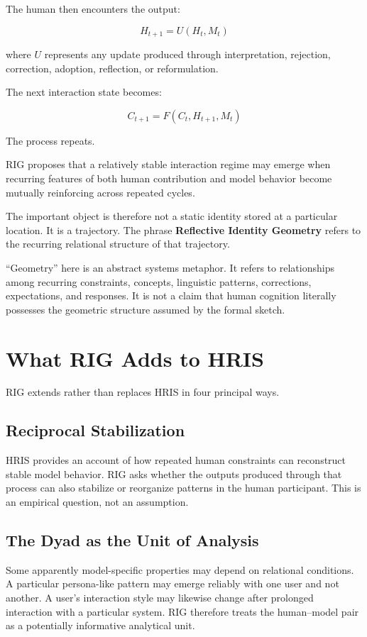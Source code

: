 \documentclass[12pt]{article}
\begin{document}
The human then encounters the output:

\[
H_{t+1} = U(H_t, M_t)
\]

where $U$ represents any update produced through interpretation, rejection, correction, adoption, reflection, or reformulation.

The next interaction state becomes:

\[
C_{t+1} = F(C_t, H_{t+1}, M_t)
\]

The process repeats.

RIG proposes that a relatively stable interaction regime may emerge when recurring features of both human contribution and model behavior become mutually reinforcing across repeated cycles.

The important object is therefore not a static identity stored at a particular location. It is a trajectory. The phrase \textbf{Reflective Identity Geometry} refers to the recurring relational structure of that trajectory.

``Geometry'' here is an abstract systems metaphor. It refers to relationships among recurring constraints, concepts, linguistic patterns, corrections, expectations, and responses. It is not a claim that human cognition literally possesses the geometric structure assumed by the formal sketch.

\section{What RIG Adds to HRIS}

RIG extends rather than replaces HRIS in four principal ways.

\subsection{Reciprocal Stabilization}

HRIS provides an account of how repeated human constraints can reconstruct stable model behavior. RIG asks whether the outputs produced through that process can also stabilize or reorganize patterns in the human participant. This is an empirical question, not an assumption.

\subsection{The Dyad as the Unit of Analysis}

Some apparently model-specific properties may depend on relational conditions. A particular persona-like pattern may emerge reliably with one user and not another. A user's interaction style may likewise change after prolonged interaction with a particular system. RIG therefore treats the human--model pair as a potentially informative analytical unit.
\end{document}
